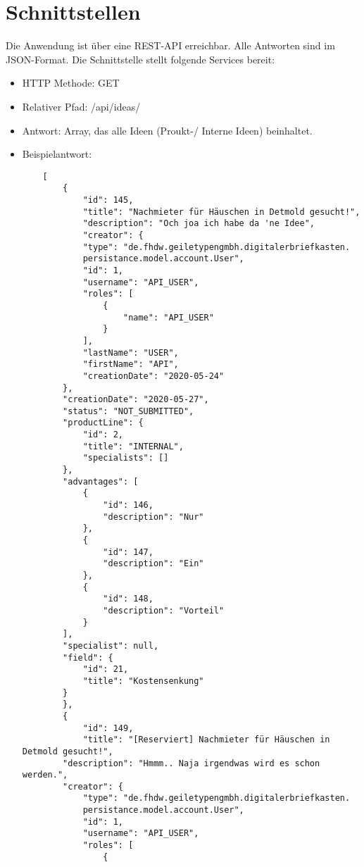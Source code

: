 \usepackage{cleveref}



\section{Schnittstellen}

Die Anwendung ist über eine REST-API erreichbar. Alle Antworten sind im JSON-Format. Die Schnittstelle stellt folgende Services bereit:
\begin{itemize}
    \item HTTP Methode: GET
    \item Relativer Pfad: /api/ideas/
    \item Antwort: Array, das alle Ideen (Proukt-/ Interne Ideen) beinhaltet.
    \item Beispielantwort:
    \begin{verbatim}
    [
        {
            "id": 145,
            "title": "Nachmieter für Häuschen in Detmold gesucht!",
            "description": "Och joa ich habe da 'ne Idee",
            "creator": {
            "type": "de.fhdw.geiletypengmbh.digitalerbriefkasten.
            persistance.model.account.User",
            "id": 1,
            "username": "API_USER",
            "roles": [
                {
                    "name": "API_USER"
                }
            ],
            "lastName": "USER",
            "firstName": "API",
            "creationDate": "2020-05-24"
        },
        "creationDate": "2020-05-27",
        "status": "NOT_SUBMITTED",
        "productLine": {
            "id": 2,
            "title": "INTERNAL",
            "specialists": []
        },
        "advantages": [
            {
                "id": 146,
                "description": "Nur"
            },
            {
                "id": 147,
                "description": "Ein"
            },
            {
                "id": 148,
                "description": "Vorteil"
            }
        ],
        "specialist": null,
        "field": {
            "id": 21,
            "title": "Kostensenkung"
        }
        },
        {
            "id": 149,
            "title": "[Reserviert] Nachmieter für Häuschen in Detmold gesucht!",
        "description": "Hmmm.. Naja irgendwas wird es schon werden.",
        "creator": {
            "type": "de.fhdw.geiletypengmbh.digitalerbriefkasten.
            persistance.model.account.User",
            "id": 1,
            "username": "API_USER",
            "roles": [
                {

\end{verbatim}
\end{itemize}

